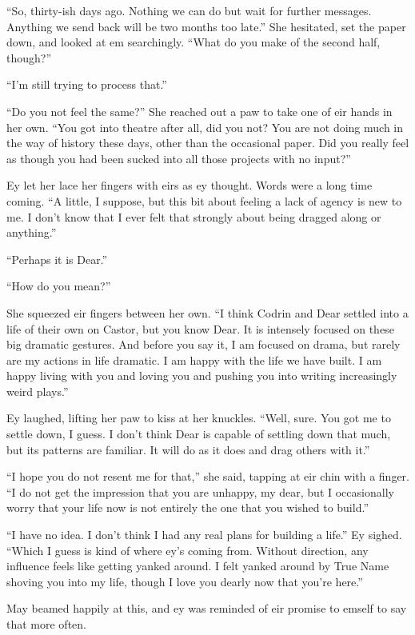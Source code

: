 ``So, thirty-ish days ago. Nothing we can do but wait for further messages. Anything we send back will be two months too late.'' She hesitated, set the paper down, and looked at em searchingly. ``What do you make of the second half, though?''

``I'm still trying to process that.''

``Do you not feel the same?'' She reached out a paw to take one of eir hands in her own. ``You got into theatre after all, did you not? You are not doing much in the way of history these days, other than the occasional paper. Did you really feel as though you had been sucked into all those projects with no input?''

Ey let her lace her fingers with eirs as ey thought. Words were a long time coming. ``A little, I suppose, but this bit about feeling a lack of agency is new to me. I don't know that I ever felt that strongly about being dragged along or anything.''

``Perhaps it is Dear.''

``How do you mean?''

She squeezed eir fingers between her own. ``I think Codrin and Dear settled into a life of their own on Castor, but you know Dear. It is intensely focused on these big dramatic gestures. And before you say it, I am focused on drama, but rarely are my actions in life dramatic. I am happy with the life we have built. I am happy living with you and loving you and pushing you into writing increasingly weird plays.''

Ey laughed, lifting her paw to kiss at her knuckles. ``Well, sure. You got me to settle down, I guess. I don't think Dear is capable of settling down that much, but its patterns are familiar. It will do as it does and drag others with it.''

``I hope you do not resent me for that,'' she said, tapping at eir chin with a finger. ``I do not get the impression that you are unhappy, my dear, but I occasionally worry that your life now is not entirely the one that you wished to build.''

``I have no idea. I don't think I had any real plans for building a life.'' Ey sighed. ``Which I guess is kind of where ey's coming from. Without direction, any influence feels like getting yanked around. I felt yanked around by True Name shoving you into my life, though I love you dearly now that you're here.''

May beamed happily at this, and ey was reminded of eir promise to emself to say that more often.

